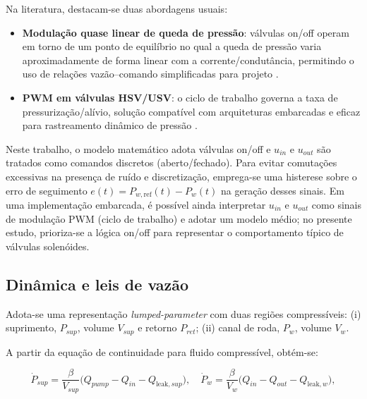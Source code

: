Na literatura, destacam-se duas abordagens usuais:
\begin{itemize}
    \item \textbf{Modulação quase linear de queda de pressão}: válvulas on/off operam em torno de um ponto de equilíbrio no qual a queda de pressão varia aproximadamente de forma linear com a corrente/condutância, permitindo o uso de relações vazão–comando simplificadas para projeto \cite{ChenLv2017}.
    \item \textbf{PWM em válvulas HSV/USV}: o ciclo de trabalho governa a taxa de pressurização/alívio, solução compatível com arquiteturas embarcadas e eficaz para rastreamento dinâmico de pressão \cite{HouhuaJing2022}.
\end{itemize}

Neste trabalho, o modelo matemático adota válvulas on/off e $u_{in}$ e $u_{out}$ são tratados como comandos discretos (aberto/fechado). Para evitar comutações excessivas na presença de ruído e discretização, emprega-se uma histerese sobre o erro de seguimento $e(t)=P_{w,\text{ref}}(t)-P_w(t)$ na geração desses sinais. Em uma implementação embarcada, é possível ainda interpretar $u_{in}$ e $u_{out}$ como sinais de modulação PWM (ciclo de trabalho) e adotar um modelo médio; no presente estudo, prioriza-se a lógica on/off para representar o comportamento típico de válvulas solenóides.

\subsection{Dinâmica e leis de vazão}
\label{sec:controle-modelo-hidraulico-2p}

Adota-se uma representação \emph{lumped-parameter} com duas regiões compressíveis: (i) suprimento, $P_{sup}$, volume $V_{sup}$ e retorno $P_{ret}$; (ii) canal de roda, $P_w$, volume $V_w$.

A partir da equação de continuidade para fluido compressível, obtém-se:

\begin{equation}
    \dot{P}_{sup} = \frac{\beta}{V_{sup}}\Big(Q_{pump} - Q_{in} - Q_{\text{leak},sup}\Big),
    \quad
    \dot{P}_{w} = \frac{\beta}{V_{w}}\Big(Q_{in} - Q_{out} - Q_{\text{leak},w}\Big),
    \label{eq:din_press}
\end{equation}

